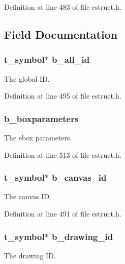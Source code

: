 Definition at line 483 of file estruct.\-h.



\subsection{Field Documentation}
\hypertarget{struct__edspbox_a0f63dcf604135dd4fbfbf43eaed53c1a}{
\subsubsection[{b\-\_\-all\-\_\-id}]{\setlength{\rightskip}{0pt plus 5cm}t\-\_\-symbol$\ast$ b\-\_\-all\-\_\-id}}\label{struct__edspbox_a0f63dcf604135dd4fbfbf43eaed53c1a}
The global I\-D. 

Definition at line 495 of file estruct.\-h.

\hypertarget{struct__edspbox_a01fa53a36dc717c81755d805a868ad9d}{
\subsubsection[{b\-\_\-boxparameters}]{ b\-\_\-boxparameters}}\label{struct__edspbox_a01fa53a36dc717c81755d805a868ad9d}
The ebox parameters. 

Definition at line 513 of file estruct.\-h.

\hypertarget{struct__edspbox_ac0251c6969a1032f8f50d076e909fb3e}{
\subsubsection[{b\-\_\-canvas\-\_\-id}]{\setlength{\rightskip}{0pt plus 5cm}t\-\_\-symbol$\ast$ b\-\_\-canvas\-\_\-id}}\label{struct__edspbox_ac0251c6969a1032f8f50d076e909fb3e}
The canvas I\-D. 

Definition at line 491 of file estruct.\-h.

\hypertarget{struct__edspbox_a153f9c9929d722ecb29217f3fb0914c9}{
\subsubsection[{b\-\_\-drawing\-\_\-id}]{\setlength{\rightskip}{0pt plus 5cm}t\-\_\-symbol$\ast$ b\-\_\-drawing\-\_\-id}}\label{struct__edspbox_a153f9c9929d722ecb29217f3fb0914c9}
The drawing I\-D. 

